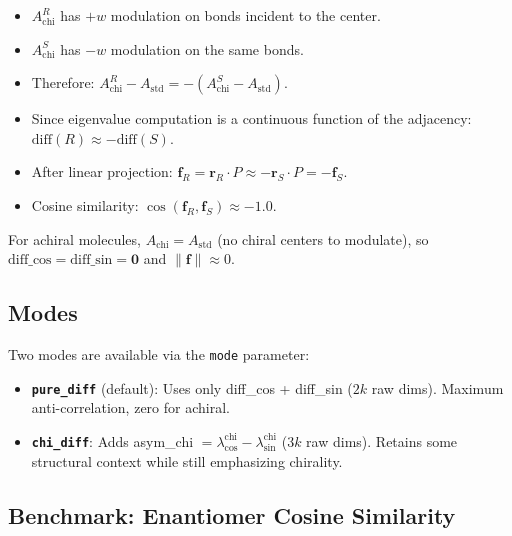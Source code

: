 \documentclass[11pt,a4paper]{article}
\begin{document}
\begin{itemize}[leftmargin=*]
    \item $A^R_{\text{chi}}$ has $+w$ modulation on bonds incident to the center.
    \item $A^S_{\text{chi}}$ has $-w$ modulation on the same bonds.
    \item Therefore: $A^R_{\text{chi}} - A_{\text{std}} = -(A^S_{\text{chi}} - A_{\text{std}})$.
    \item Since eigenvalue computation is a continuous function of the adjacency: $\text{diff}(R) \approx -\text{diff}(S)$.
    \item After linear projection: $\mathbf{f}_R = \mathbf{r}_R \cdot P \approx -\mathbf{r}_S \cdot P = -\mathbf{f}_S$.
    \item Cosine similarity: $\cos(\mathbf{f}_R, \mathbf{f}_S) \approx -1.0$.
\end{itemize}

For achiral molecules, $A_{\text{chi}} = A_{\text{std}}$ (no chiral centers to modulate), so $\text{diff\_cos} = \text{diff\_sin} = \mathbf{0}$ and $\|\mathbf{f}\| \approx 0$.

\subsection{Modes}

Two modes are available via the \texttt{mode} parameter:

\begin{itemize}[leftmargin=*]
    \item \textbf{\texttt{pure\_diff}} (default): Uses only diff\_cos + diff\_sin ($2k$ raw dims). Maximum anti-correlation, zero for achiral.
    \item \textbf{\texttt{chi\_diff}}: Adds asym\_chi $= \lambda^{\text{chi}}_{\cos} - \lambda^{\text{chi}}_{\sin}$ ($3k$ raw dims). Retains some structural context while still emphasizing chirality.
\end{itemize}

\subsection{Benchmark: Enantiomer Cosine Similarity}
\end{document}
